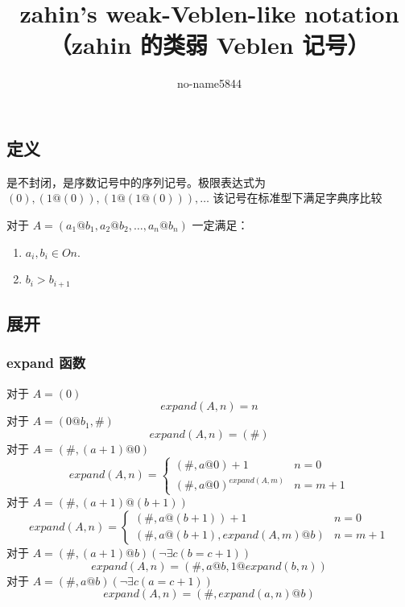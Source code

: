 \documentclass[UTF8]{ctexart}
\title{zahin's weak-Veblen-like notation（zahin 的类弱 Veblen 记号）}
\author{no-name5844}
\begin{document}
\maketitle

\setcounter{section}{1}

\subsection{定义}
是不封闭，是序数记号中的序列记号。极限表达式为 $(0),\allowbreak(1@(0)),\allowbreak(1@(1@(0))),\allowbreak\dots$
该记号在标准型下满足字典序比较

对于 $A=(a_1@b_1,a_2@b_2,\dots,a_n@b_n)$ 一定满足：
\begin{enumerate}
  \item $a_i,b_i\in On.$
  \item $b_i>b_{i+1}$
\end{enumerate}

\subsection{展开}
\subsubsection{expand 函数}
对于 $A=(0)$
\[
expand(A,n)=n
\]
对于 $A=(0@b_1,\#)$
\[
expand(A,n)=(\#)
\]
对于 $A=(\#,(a+1)@0)$
\[
expand(A,n)=\begin{cases}
(\#,a@0)+1 & n=0\\
(\#,a@0)^{expand(A,m)} & n=m+1
\end{cases}
\]
对于 $A=(\#,(a+1)@(b+1))$
\[
expand(A,n)=\begin{cases}
(\#,a@(b+1))+1 & n=0\\
(\#,a@(b+1),expand(A,m)@b) & n=m+1
\end{cases}
\]
对于 $A=(\#,(a+1)@b)(\lnot\exists c(b=c+1))$
\[
expand(A,n)=(\#,a@b,1@expand(b,n))
\]
对于 $A=(\#,a@b)(\lnot\exists c(a=c+1))$
\[
expand(A,n)=(\#,expand(a,n)@b)
\]
\end{document}
